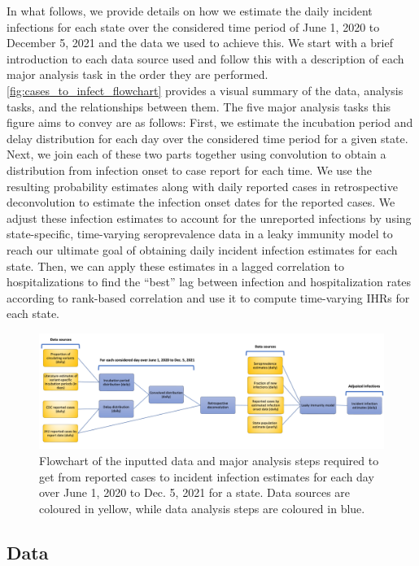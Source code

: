 \documentclass{article}
\begin{document}
In what follows, we provide details on how we estimate the daily incident
infections for each state over the considered time period of June 1, 2020 to
December 5, 2021 and the data we used to achieve this. We start with a brief
introduction to each data source used and follow this with a description of each
major analysis task in the order they are performed.
\autoref{fig:cases_to_infect_flowchart} provides a visual summary of the data,
analysis tasks, and the relationships between them. The five major analysis
tasks this figure aims to convey are as follows: First, we estimate the
incubation period and delay distribution for each day over the considered time
period for a given state. Next, we join each of these two parts together using
convolution to obtain a distribution from infection onset to case report for
each time. We use the resulting probability estimates along with daily reported
cases in retrospective deconvolution to estimate the infection onset dates for
the reported cases. We adjust these infection estimates to account for the
unreported infections by using state-specific, time-varying seroprevalence data
in a leaky immunity model to reach our ultimate goal of obtaining daily incident
infection estimates for each state. Then, we can apply these estimates in a
lagged correlation to hospitalizations to find the ``best'' lag between
infection and hospitalization rates according to rank-based correlation and use
it to compute time-varying IHRs for each state. 


\begin{figure}[!tb]
\centering
    \includegraphics[width=.99\textwidth]{Reported_cases_to_infect_flowchart.pdf} 
    \caption{Flowchart of the inputted data and major analysis steps required 
    to get from reported cases to incident infection estimates for each day 
    over June 1, 2020 to Dec. 5, 2021 for a state. Data sources are coloured 
    in yellow, while data analysis steps are coloured in blue.}
    \label{fig:cases_to_infect_flowchart}
\end{figure}


\subsection{Data} 
\end{document}
